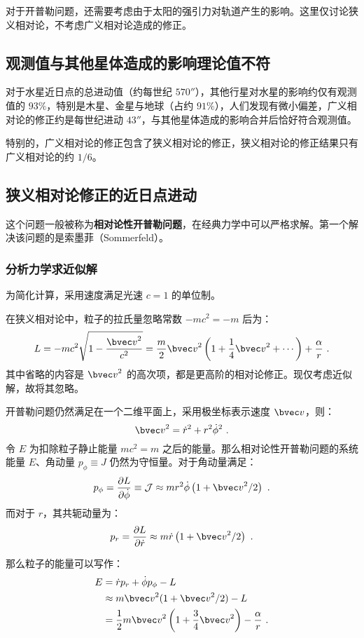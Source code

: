 



对于开普勒问题，还需要考虑由于太阳的强引力对轨道产生的影响。这里仅讨论狭义相对论，不考虑广义相对论造成的修正。

\subsection{观测值与其他星体造成的影响理论值不符}
对于水星近日点的总进动值（约每世纪 $570''$），其他行星对水星的影响约仅有观测值的 $93 \%$，特别是木星、金星与地球（占约 $91\%$），人们发现有微小偏差，广义相对论的修正约是每世纪进动 $43''$，与其他星体造成的影响合并后恰好符合观测值。

特别的，广义相对论的修正包含了狭义相对论的修正，狭义相对论的修正结果只有广义相对论的约 $1/6$。

\subsection{狭义相对论修正的近日点进动}
这个问题一般被称为\textbf{相对论性开普勒问题}，在经典力学中可以严格求解。第一个解决该问题的是索墨菲（Sommerfeld）。

\subsubsection{分析力学求近似解}
为简化计算，采用速度满足光速 $c=1$ 的单位制。

在狭义相对论中，粒子的拉氏量忽略常数 $-mc^2 = -m$ 后为：
$$L = -mc^2 \sqrt{1- \frac{{\bvec v}^2}{c^2}} = \frac{m}{2} {\bvec v}^2 \left( 1+\frac{1}{4} {\bvec v}^2 + \cdots \right) + \frac{\alpha}{r} ~.$$
其中省略的内容是 ${\bvec v}^2$ 的高次项，都是更高阶的相对论修正。现仅考虑近似解，故将其忽略。

开普勒问题仍然满足在一个二维平面上，采用极坐标表示速度 $\bvec v$，则：
$${\bvec v}^2 = \dot r^2 + r^2 \dot \phi^2 ~.$$
令 $E$ 为扣除粒子静止能量 $mc^2 = m$ 之后的能量。那么相对论性开普勒问题的系统能量 $E$、角动量 $p_\phi \equiv J$ 仍然为守恒量。对于角动量满足：
$$p_\phi = \frac{\partial L}{\partial {\dot \phi}} \equiv \mathcal J \approx mr^2 \dot \phi \left( 1+ {\bvec v}^2/2 \right)~.$$
而对于 $r$，其共轭动量为：
$$p_r = \frac{\partial L}{\partial {\dot r}} \approx m \dot r \left( 1 + {\bvec v}^2/2 \right)~.$$

那么粒子的能量可以写作：
\begin{equation}
\begin{aligned}
E &= \dot r p_r + \dot \phi p_\phi - L \\
&\approx m {\bvec v}^2(1+{\bvec v}^2/2)-L \\
&= \frac{1}{2} m {\bvec v}^2 \left( 1 + \frac{3}{4} {\bvec v}^2 \right) - \frac{\alpha}{r} ~.
\end{aligned}
\end{equation}

